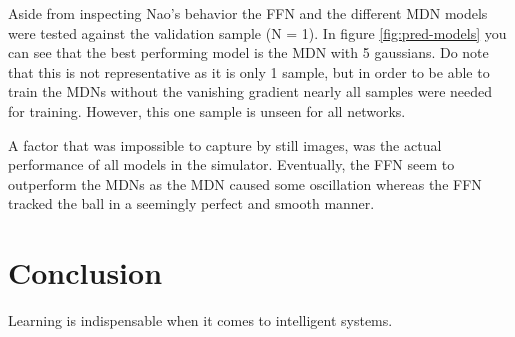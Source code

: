 \documentclass{article}
\begin{document}
    Aside from inspecting Nao's behavior the FFN and the different MDN models were tested against the validation sample (N = 1).
    In figure \ref{fig:pred-models} you can see that the best performing model is the MDN with 5 gaussians.
    Do note that this is not representative as it is only 1 sample, but in order to be able to train the MDNs without the vanishing gradient nearly all samples were needed for training.
    However, this one sample is unseen for all networks.

    A factor that was impossible to capture by still images, was the actual performance of all models in the simulator.
    Eventually, the FFN seem to outperform the MDNs as the MDN caused some oscillation whereas the FFN tracked the ball in a seemingly perfect and smooth manner.

    \pagebreak
    \section{Conclusion}\label{sec:conclusion}
    Learning is indispensable when it comes to intelligent systems. 



    
    
\end{document}
